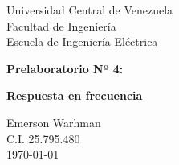 \begin{titlepage}
    \centering
    \Large
    Universidad Central de Venezuela\\
    Facultad de Ingeniería\\
    Escuela de Ingeniería Eléctrica
    \vspace*{8cm}

    \Huge
    \textbf{Prelaboratorio Nº 4:} 

    \textbf{Respuesta en frecuencia}
    \vfill


    \Large

    Emerson Warhman \\
    C.I. 25.795.480 \\
    \today

\end{titlepage}